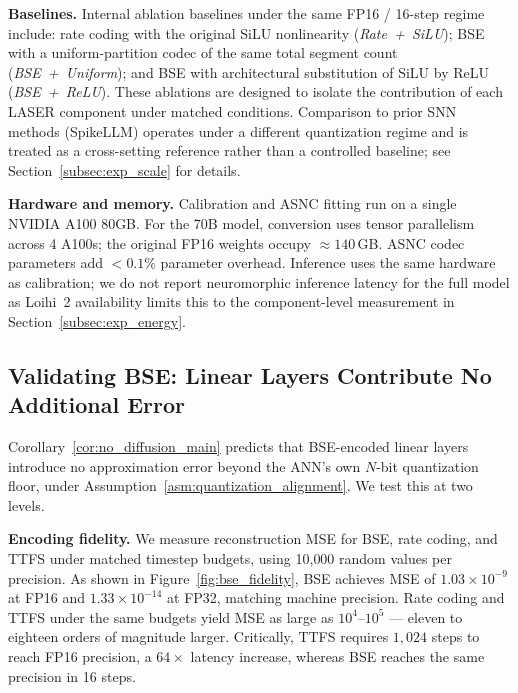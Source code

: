 \documentclass{article}
\theoremstyle{plain}
\theoremstyle{definition}
\theoremstyle{remark}
\begin{document}
\noindent\textbf{Baselines.}
Internal ablation baselines under the same FP16 / 16-step regime include: rate
coding with the original SiLU nonlinearity (\textit{Rate~+~SiLU}); BSE with a
uniform-partition codec of the same total segment count (\textit{BSE~+~Uniform});
and BSE with architectural substitution of SiLU by ReLU (\textit{BSE~+~ReLU}).
These ablations are designed to isolate the contribution of each LASER component
under matched conditions. Comparison to prior SNN methods (SpikeLLM) operates under
a different quantization regime and is treated as a cross-setting reference rather
than a controlled baseline; see Section~\ref{subsec:exp_scale} for details.

\noindent\textbf{Hardware and memory.}
Calibration and ASNC fitting run on a single NVIDIA A100 80GB. For the 70B model,
conversion uses tensor parallelism across 4 A100s; the original FP16 weights occupy
$\approx\!140$\,GB. ASNC codec parameters add $< 0.1\%$ parameter overhead. Inference
uses the same hardware as calibration; we do not report neuromorphic inference
latency for the full model as Loihi~2 availability limits this to the component-level
measurement in Section~\ref{subsec:exp_energy}.


\subsection{Validating BSE: Linear Layers Contribute No Additional Error}
\label{subsec:exp_bse}

Corollary~\ref{cor:no_diffusion_main} predicts that BSE-encoded linear layers
introduce no approximation error beyond the ANN's own $N$-bit quantization floor,
under Assumption~\ref{asm:quantization_alignment}. We test this at two levels.

\noindent\textbf{Encoding fidelity.}
We measure reconstruction MSE for BSE, rate coding, and TTFS under matched timestep
budgets, using 10{,}000 random values per precision. As shown in
Figure~\ref{fig:bse_fidelity}, BSE achieves MSE of $1.03 \times 10^{-9}$ at FP16
and $1.33 \times 10^{-14}$ at FP32, matching machine precision. Rate coding and TTFS
under the same budgets yield MSE as large as $10^4$--$10^5$ — eleven to eighteen
orders of magnitude larger. Critically, TTFS requires $1{,}024$ steps to reach FP16
precision, a $64\times$ latency increase, whereas BSE reaches the same precision in
16 steps.
\end{document}
